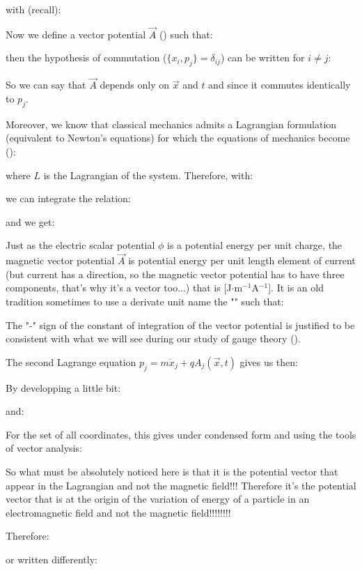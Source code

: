 	with (recall):
	
	Now we define a vector potential $\vec{A}$ () such that:
	
	then the hypothesis of commutation ($\{x_i,p_j\}=\delta_{ij}$)  can be written for $i\neq j$:
	
	So we can say that $\vec{A}$ depends only on $\vec{x}$ and $t$ and since it commutes identically to $p_j$.
	
	Moreover, we know that classical mechanics admits a Lagrangian formulation (equivalent to Newton's equations) for which the equations of mechanics become ():
	
	where $L$ is the Lagrangian of the system. Therefore, with:
	
	we can integrate the relation:
	
	and we get:
	
	 Just as the electric scalar potential $\phi$ is a potential energy per unit charge, the magnetic vector potential $\vec{A}$ is potential energy per unit length element of current (but current has a direction, so the magnetic vector potential has to have three components, that's why it's a vector too...) that is [J$\cdot$m$^{-1}$A$^{-1}$]. It is an old tradition sometimes to use a derivate unit name the "" such that:
	 
	The "-" sign of the constant of integration of the vector potential is justified to be consistent with what we will see during our study of gauge theory ().

	The second Lagrange equation $p_j=m\dot{x}_j+qA_j(\vec{x},t)$ gives us then:
	
	By developping a little bit:
	
	and:
	
	For the set of all coordinates, this gives under condensed form and using the tools of vector analysis:
	
	So what must be absolutely noticed here is that it is the potential vector that appear in the Lagrangian and not the magnetic field!!! Therefore it's the potential vector that is at the origin of the variation of energy of a particle in an electromagnetic field and not the magnetic field!!!!!!!!
	
	Therefore:
	
	or written differently:
	
